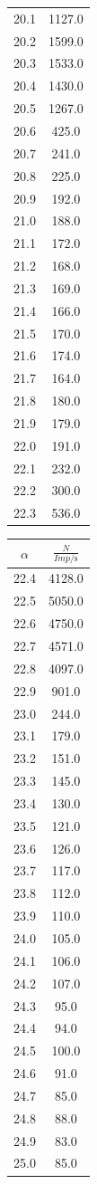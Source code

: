 \begin{table}
\begin{tabular}[t]{cc}
  20.1 & 1127.0\\
  20.2 & 1599.0\\
  20.3 & 1533.0\\
  20.4 & 1430.0\\
  20.5 & 1267.0\\
  20.6 & 425.0\\
  20.7 & 241.0\\
  20.8 & 225.0\\
  20.9 & 192.0\\
  21.0 & 188.0\\
  21.1 & 172.0\\
  21.2 & 168.0\\
  21.3 & 169.0\\
  21.4 & 166.0\\
  21.5 & 170.0\\
  21.6 & 174.0\\
  21.7 & 164.0\\
  21.8 & 180.0\\
  21.9 & 179.0\\
  22.0 & 191.0\\
  22.1 & 232.0\\
  22.2 & 300.0\\
  22.3 & 536.0\\
  \bottomrule
  \end{tabular}
  \begin{tabular}[t]{cc}
  \toprule
  $\alpha$ & $\frac{N}{Imp/\si{\second}}$ \\
  \midrule
  22.4 & 4128.0\\
  22.5 & 5050.0\\
  22.6 & 4750.0\\
  22.7 & 4571.0\\
  22.8 & 4097.0\\
  22.9 & 901.0\\
  23.0 & 244.0\\
  23.1 & 179.0\\
  23.2 & 151.0\\
  23.3 & 145.0\\
  23.4 & 130.0\\
  23.5 & 121.0\\
  23.6 & 126.0\\
  23.7 & 117.0\\
  23.8 & 112.0\\
  23.9 & 110.0\\
  24.0 & 105.0\\
  24.1 & 106.0\\
  24.2 & 107.0\\
  24.3 & 95.0\\
  24.4 & 94.0\\
  24.5 & 100.0\\
  24.6 & 91.0\\
  24.7 & 85.0\\
  24.8 & 88.0\\
  24.9 & 83.0\\
  25.0 & 85.0\\
  \bottomrule
  \end{tabular}
  \label{tab:emmision2}
\end{table}
\FloatBarrier

